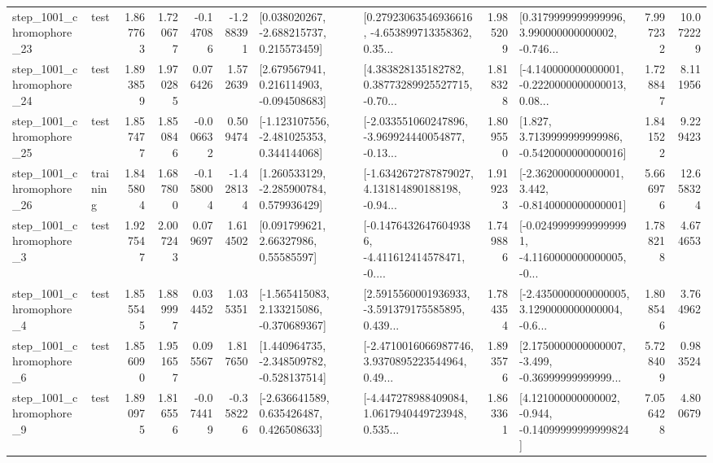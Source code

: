 \begin{tabular}{llrrrrllrlrr}
 step\_1001\_chromophore\_23 &      test &      1.867763 &    1.720677 &     -0.147086 & -1.288391 &    [0.038020267, -2.688215737, 0.215573459] &  [0.27923063546936616, -4.653899713358362, 0.35... &       1.985209 &  [0.3179999999999996, 3.990000000000002, -0.746... &            7.997232 &         10.072229 \\
 step\_1001\_chromophore\_24 &      test &      1.893859 &    1.970285 &      0.076426 &  1.572639 &    [2.679567941, 0.216114903, -0.094508683] &  [4.383828135182782, 0.38773289925527715, -0.70... &       1.818328 &  [-4.140000000000001, -0.2220000000000013, 0.08... &            1.728847 &          8.111956 \\
 step\_1001\_chromophore\_25 &      test &      1.857477 &    1.850846 &     -0.006632 &  0.509474 &   [-1.123107556, -2.481025353, 0.344144068] &  [-2.033551060247896, -3.969924440054877, -0.13... &       1.809550 &   [1.827, 3.7139999999999986, -0.5420000000000016] &            1.841522 &          9.229423 \\
 step\_1001\_chromophore\_26 &  training &      1.845804 &    1.687800 &     -0.158004 & -1.428134 &    [1.260533129, -2.285900784, 0.579936429] &  [-1.6342672787879027, 4.131814890188198, -0.94... &       1.919233 &   [-2.362000000000001, 3.442, -0.8140000000000001] &            5.666976 &         12.658324 \\
  step\_1001\_chromophore\_3 &      test &      1.927547 &    2.007243 &      0.079697 &  1.614502 &       [0.091799621, 2.66327986, 0.55585597] &  [-0.14764326476049386, -4.411612414578471, -0.... &       1.749886 &  [-0.02499999999999991, -4.1160000000000005, -0... &            1.788218 &          4.674653 \\
  step\_1001\_chromophore\_4 &      test &      1.855545 &    1.889997 &      0.034452 &  1.035351 &   [-1.565415083, 2.133215086, -0.370689367] &  [2.5915560001936933, -3.591379175585895, 0.439... &       1.784354 &  [-2.4350000000000005, 3.1290000000000004, -0.6... &            1.808546 &          3.764962 \\
  step\_1001\_chromophore\_6 &      test &      1.856090 &    1.951657 &      0.095567 &  1.817650 &   [1.440964735, -2.348509782, -0.528137514] &  [-2.4710016066987746, 3.9370895223544964, 0.49... &       1.893576 &  [2.1750000000000007, -3.499, -0.36999999999999... &            5.728409 &          0.983524 \\
  step\_1001\_chromophore\_9 &      test &      1.890975 &    1.816556 &     -0.074419 & -0.358226 &    [-2.636641589, 0.635426487, 0.426508633] &  [-4.447278988409084, 1.0617940449723948, 0.535... &       1.863361 &  [4.121000000000002, -0.944, -0.14099999999999824] &            7.056428 &          4.800679 \\

\end{tabular}
